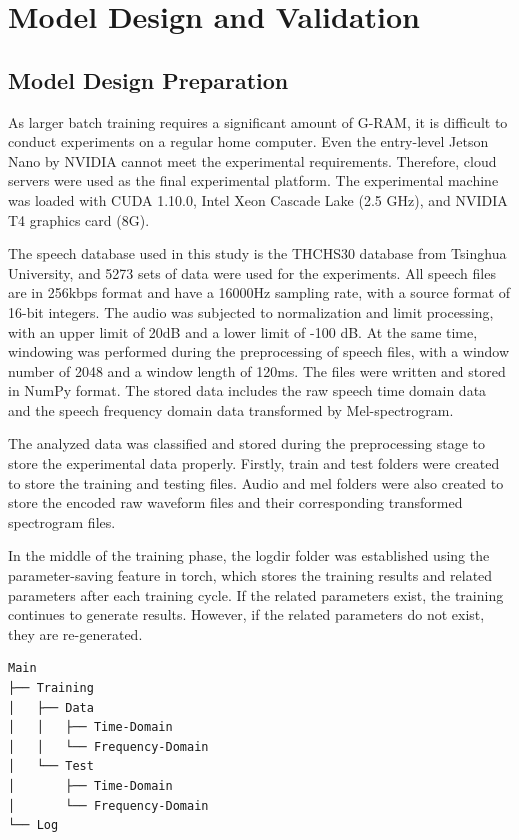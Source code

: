 \documentclass[10pt,journal,compsoc]{IEEEtran}
\begin{document}
\section{Model Design and Validation}

\subsection{Model Design Preparation}

As larger batch training requires a significant amount of G-RAM, it is difficult to conduct experiments on a regular home computer. Even the entry-level Jetson Nano by NVIDIA cannot meet the experimental requirements. Therefore, cloud servers were used as the final experimental platform. The experimental machine was loaded with CUDA 1.10.0, Intel Xeon Cascade Lake (2.5 GHz), and NVIDIA T4 graphics card (8G). 

The speech database used in this study is the THCHS30 database from Tsinghua University, and 5273 sets of data were used for the experiments. All speech files are in 256kbps format and have a 16000Hz sampling rate, with a source format of 16-bit integers. The audio was subjected to normalization and limit processing, with an upper limit of 20dB and a lower limit of -100 dB. At the same time, windowing was performed during the preprocessing of speech files, with a window number of 2048 and a window length of 120ms. The files were written and stored in NumPy format. The stored data includes the raw speech time domain data and the speech frequency domain data transformed by Mel-spectrogram. 

The analyzed data was classified and stored during the preprocessing stage to store the experimental data properly. Firstly, train and test folders were created to store the training and testing files. Audio and mel folders were also created to store the encoded raw waveform files and their corresponding transformed spectrogram files.

In the middle of the training phase, the logdir folder was established using the parameter-saving feature in torch, which stores the training results and related parameters after each training cycle. If the related parameters exist, the training continues to generate results. However, if the related parameters do not exist, they are re-generated.

\begin{lstlisting}[caption={File Tree}, label={lst:3-1}]
Main
├── Training
│   ├── Data
│   │   ├── Time-Domain
│   │   └── Frequency-Domain
│   └── Test
│       ├── Time-Domain
│       └── Frequency-Domain
└── Log
\end{lstlisting}
\end{document}
